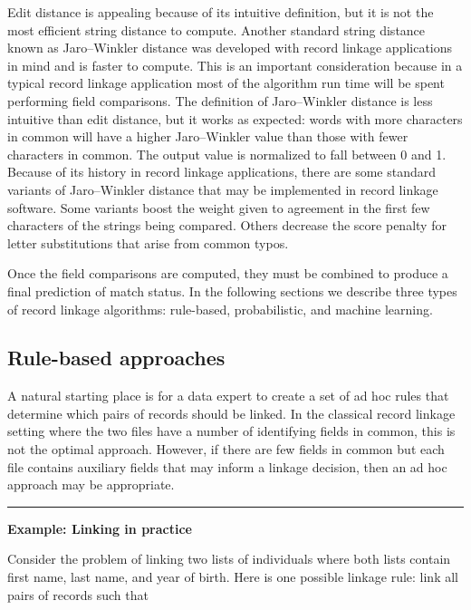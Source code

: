 \documentclass[]{krantz}
\begin{document}
Edit distance is appealing because of its intuitive definition, but it
is not the most efficient string distance to compute. Another standard
string distance known as Jaro--Winkler distance was developed with
record linkage applications in mind and is faster to compute. This is an
important consideration because in a typical record linkage application
most of the algorithm run time will be spent performing field
comparisons. The definition of Jaro--Winkler distance is less intuitive
than edit distance, but it works as expected: words with more characters
in common will have a higher Jaro--Winkler value than those with fewer
characters in common. The output value is normalized to fall between 0
and 1. Because of its history in record linkage applications, there are
some standard variants of Jaro--Winkler distance that may be implemented
in record linkage software. Some variants boost the weight given to
agreement in the first few characters of the strings being compared.
Others decrease the score penalty for letter substitutions that arise
from common typos.

Once the field comparisons are computed, they must be combined to
produce a final prediction of match status. In the following sections we
describe three types of record linkage algorithms: rule-based,
probabilistic, and machine learning.

\subsection{Rule-based approaches}\label{rule-based-approaches}

A natural starting place is for a data expert to create a set of ad hoc
rules that determine which pairs of records should be linked. In the
classical record linkage setting where the two files have a number of
identifying fields in common, this is not the optimal approach. However,
if there are few fields in common but each file contains auxiliary
fields that may inform a linkage decision, then an ad hoc approach may
be appropriate.

\begin{center}\rule{0.5\linewidth}{\linethickness}\end{center}

\textbf{Example: Linking in practice}

Consider the problem of linking two lists of individuals where both
lists contain first name, last name, and year of birth. Here is one
possible linkage rule: link all pairs of records such that
\end{document}
